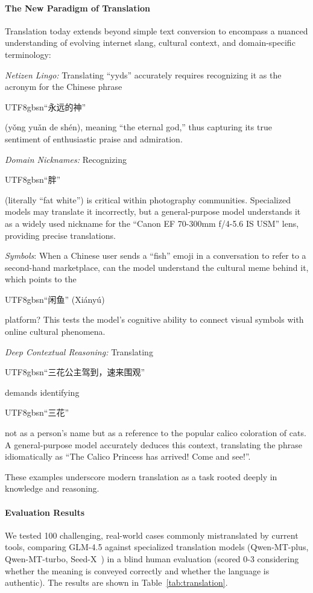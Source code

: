 \paragraph{The New Paradigm of Translation} Translation today extends beyond simple text conversion to encompass a nuanced understanding of evolving internet slang, cultural context, and domain-specific terminology:

\textit{Netizen Lingo:} Translating ``yyds'' accurately requires recognizing it as the acronym for the Chinese phrase \begin{CJK*}{UTF8}{gbsn}``永远的神''\end{CJK*} (yǒng yuǎn de shén), meaning ``the eternal god,'' thus capturing its true sentiment of enthusiastic praise and admiration.

\textit{Domain Nicknames:} Recognizing \begin{CJK*}{UTF8}{gbsn}``胖''\end{CJK*} (literally ``fat white'') is critical within photography communities. Specialized models may translate it incorrectly, but a general-purpose model understands it as a widely used nickname for the ``Canon EF 70-300mm f/4-5.6 IS USM'' lens, providing precise translations.

\textit{Symbols}: When a Chinese user sends a ``fish'' emoji in a conversation to refer to a second-hand marketplace, can the model understand the cultural meme behind it, which points to the \begin{CJK*}{UTF8}{gbsn}``闲鱼'' (Xiányú)\end{CJK*} platform? This tests the model's cognitive ability to connect visual symbols with online cultural phenomena.


\textit{Deep Contextual Reasoning:} Translating \begin{CJK*}{UTF8}{gbsn}``三花公主驾到，速来围观''\end{CJK*} demands identifying \begin{CJK*}{UTF8}{gbsn}``三花''\end{CJK*} not as a person's name but as a reference to the popular calico coloration of cats. A general-purpose model accurately deduces this context, translating the phrase idiomatically as ``The Calico Princess has arrived! Come and see!''.

These examples underscore modern translation as a task rooted deeply in knowledge and reasoning.

\paragraph{Evaluation Results} We tested 100 challenging, real-world cases commonly mistranslated by current tools, comparing GLM-4.5 against specialized translation models (Qwen-MT-plus, Qwen-MT-turbo, Seed-X~\cite{cheng2025seed}) in a blind human evaluation (scored 0-3 considering whether the meaning is conveyed correctly and whether the language is authentic). The results are shown in Table~\ref{tab:translation}.

